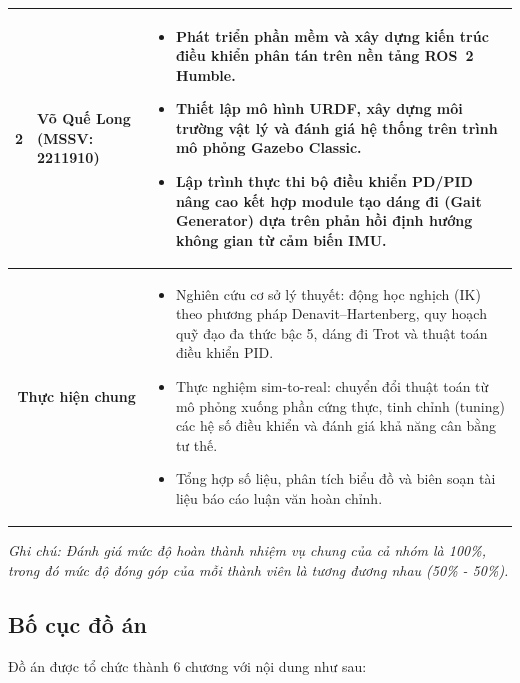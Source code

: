 \begin{table}[H]
\begin{tabular}{|p{}|p{}|p{}|}
        2 & Võ Quế Long \newline (MSSV: 2211910) & 
        \vspace{-0.4cm}
        \begin{itemize}
            \item Phát triển phần mềm và xây dựng kiến trúc điều khiển phân tán trên nền tảng ROS~2 Humble.
            \item Thiết lập mô hình URDF, xây dựng môi trường vật lý và đánh giá hệ thống trên trình mô phỏng Gazebo Classic.
            \item Lập trình thực thi bộ điều khiển PD/PID nâng cao kết hợp module tạo dáng đi (Gait Generator) dựa trên phản hồi định hướng không gian từ cảm biến IMU.
        \end{itemize} \vspace{-0.4cm} \\ \hline
        \multicolumn{2}{|c|}{\textbf{Thực hiện chung}} & 
        \vspace{-0.4cm}
        \begin{itemize}
            \item Nghiên cứu cơ sở lý thuyết: động học nghịch (IK) theo phương pháp Denavit--Hartenberg, quy hoạch quỹ đạo đa thức bậc 5, dáng đi Trot và thuật toán điều khiển PID.
            \item Thực nghiệm sim-to-real: chuyển đổi thuật toán từ mô phỏng xuống phần cứng thực, tinh chỉnh (tuning) các hệ số điều khiển và đánh giá khả năng cân bằng tư thế.
            \item Tổng hợp số liệu, phân tích biểu đồ và biên soạn tài liệu báo cáo luận văn hoàn chỉnh.
        \end{itemize} \vspace{-0.4cm} \\ \hline
    \end{tabular}
\end{table}

\textit{Ghi chú: Đánh giá mức độ hoàn thành nhiệm vụ chung của cả nhóm là 100\%, trong đó mức độ đóng góp của mỗi thành viên là tương đương nhau (50\% - 50\%).}

\subsection{Bố cục đồ án}

Đồ án được tổ chức thành 6 chương với nội dung như sau:

